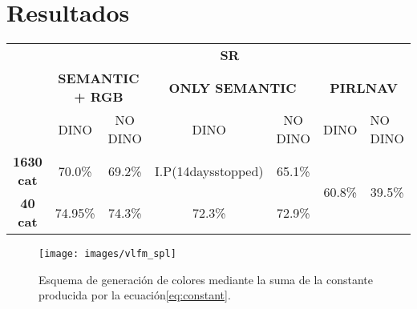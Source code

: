 \section{Resultados}


\begin{table}[H]
\begin{tabular}{l|cccccc|}
\cline{2-7}
                                               & \multicolumn{6}{c|}{\textbf{SR}}                                                                                                                                                                  \\ \cline{2-7}
\textbf{}                                      & \multicolumn{2}{c|}{\textbf{SEMANTIC + RGB}}                & \multicolumn{2}{c|}{\textbf{ONLY SEMANTIC}}              & \multicolumn{2}{c|}{\textbf{PIRLNAV}}                                    \\ \cline{2-7}
                                               & \multicolumn{1}{c|}{DINO}    & \multicolumn{1}{c|}{NO DINO} & \multicolumn{1}{c|}{DINO} & \multicolumn{1}{c|}{NO DINO} & \multicolumn{1}{l|}{DINO}                 & \multicolumn{1}{l|}{NO DINO} \\ \hline
\multicolumn{1}{|c|}{\textbf{1630 cat}} & \multicolumn{1}{c|}{70.0\%}  & \multicolumn{1}{c|}{69.2\%}  & \multicolumn{1}{c|}{I.P(14daysstopped)}     & \multicolumn{1}{c|}{65.1\%}  & \multicolumn{1}{c|}{\multirow{2}{*}{60.8\%}} & \multirow{2}{*}{39.5\%}         \\ \cline{1-5}
\multicolumn{1}{|c|}{\textbf{40 cat}}   & \multicolumn{1}{c|}{\cellcolor{lightblue}74.95\%} & \multicolumn{1}{c|}{74.3\%} & \multicolumn{1}{c|}{72.3\%}     & \multicolumn{1}{c|}{72.9\%}        & \multicolumn{1}{c|}{}                     &                              \\ \hline
\end{tabular}
\end{table}



\begin{figure}
    \centering
    \texttt{[image: images/vlfm\_spl]}
    \caption{Esquema de generación de colores mediante la suma de la constante producida por la ecuación\ref{eq:constant}.}
    \label{fig:semnavspl}
\end{figure}